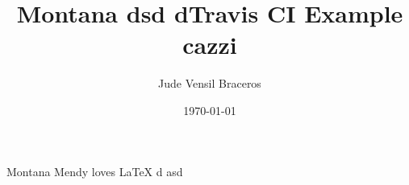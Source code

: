 \documentclass{article}
\title{Montana dsd  dTravis CI Example cazzi}
\author{Jude Vensil Braceros}
\date{\today}
\begin{document}
\maketitle

Montana Mendy loves LaTeX d asd
\end{document}

